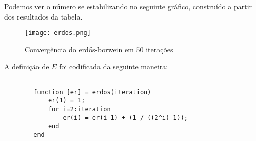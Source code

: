 		Podemos ver o número se estabilizando no seguinte gráfico, construído a
		partir dos resultados da tabela.

		\begin{figure}[H]
			\centering
			\texttt{[image: erdos.png]}
			\caption{Convergência do erdős-borwein em 50 iterações}
			\label{erdos_graphic}
		\end{figure}

		A definição de $E$ foi codificada da seguinte maneira:

		\begin{lstlisting}

		function [er] = erdos(iteration)
			er(1) = 1;
			for i=2:iteration
				er(i) = er(i-1) + (1 / ((2^i)-1));
			end
		end

		\end{lstlisting}
